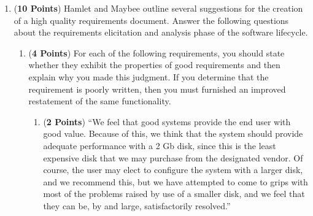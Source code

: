 \documentclass[12pt,epsf,psfig,graphics]{article}
\begin{document}
\begin{enumerate}
\begin{enumerate}





        \end{enumerate}

\newpage

\item ({\bf 10 Points}) Hamlet and Maybee outline several suggestions
  for the creation of a high quality requirements document.  Answer
  the following questions about the requirements elicitation and
  analysis phase of the software lifecycle.


        \begin{enumerate}

        \item ({\bf 4 Points}) For each of the following requirements,
          you should state whether they exhibit the properties of good
          requirements and then explain why you made this judgment.
          If you determine that the requirement is poorly written,
          then you must furnished an improved restatement of the same
          functionality.

          \begin{enumerate}

            \item ({\bf 2 Points}) ``We feel that good systems provide
              the end user with good value.  Because of this, we think
              that the system should provide adequate performance with
              a 2 Gb disk, since this is the least expensive disk that
              we may purchase from the designated vendor.  Of course,
              the user may elect to configure the system with a larger
              disk, and we recommend this, but we have attempted to
              come to grips with most of the problems raised by use of
              a smaller disk, and we feel that they can be, by and
              large, satisfactorily resolved.''


\end{enumerate}
\end{enumerate}
\end{enumerate}
\end{document}
